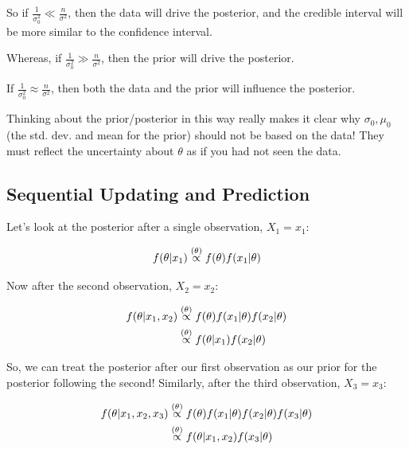 \documentclass[a4paper]{article}
\begin{document}
                So if $\frac{1}{\sigma_0^2} \ll \frac{n}{\sigma^2}$, then the
                data will drive the posterior, and the credible interval will be
                more similar to the confidence interval.

                Whereas, if $\frac{1}{\sigma_0^2} \gg \frac{n}{\sigma^2}$, then
                the prior will drive the posterior.

                If $\frac{1}{\sigma_0^2} \approx \frac{n}{\sigma^2}$, then both
                the data and the prior will influence the posterior.

                \begin{warn}
                    Thinking about the prior/posterior in this way really makes
                    it clear why $\sigma_0, \mu_0$ (the std. dev. and mean for
                    the prior) should not be based on the data! They must
                    reflect the uncertainty about $\theta$ as if you had not
                    seen the data.
                \end{warn}

        \subsection{Sequential Updating and Prediction}
            Let's look at the posterior after a single observation, $X_1 = x_1$:

            \[
                f(\theta | x_1) \stackrel{({\theta})}{\propto} f(\theta)f(x_1 | \theta)
            \]

            Now after the second observation, $X_2 = x_2$:

            \begin{align*}
                f(\theta | x_1, x_2) &\stackrel{({\theta})}{\propto} f(\theta) f(x_1 | \theta)
                    f(x_2 | \theta) \\
                & \stackrel{({\theta})}{\propto} f(\theta | x_1) f(x_2 | \theta)
            \end{align*}

            So, we can treat the posterior after our first observation as our
            prior for the posterior following the second! Similarly, after the
            third observation, $X_3 = x_3$:

            \begin{align*}
                f(\theta | x_1, x_2, x_3) & \stackrel{({\theta})}{\propto} f(\theta) f(x_1 |
                    \theta) f(x_2 | \theta) f(x_3 | \theta) \\
                & \stackrel{({\theta})}{\propto} f(\theta | x_1, x_2) f(x_3 | \theta)
            \end{align*}
\end{document}
